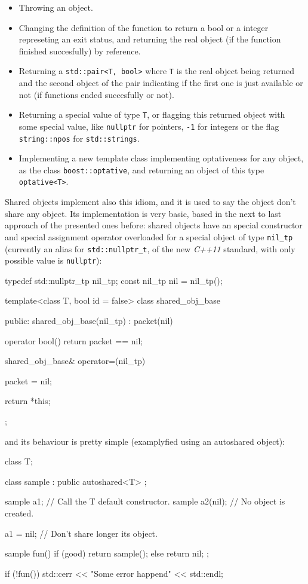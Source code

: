 \documentclass{article}
\begin{document}
\begin{itemize}
\item Throwing an object.
\item Changing the definition of the function to return a bool or a integer
  represeting an exit status, and returning the real object (if the function
  finished succesfully) by reference.
\item Returning a \texttt{std::pair<T, bool>} where \texttt{T} is the real
  object being returned and the second object of the pair indicating if the
  first one is just available or not (if functions ended succesfully or not).
\item Returning a special value of type \texttt{T}, or flagging this returned
  object with some special value, like \texttt{nullptr} for pointers,
  \texttt{-1} for integers or the flag \texttt{string::npos} for
  \texttt{std::strings}.
\item Implementing a new template class implementing optativeness for any
  object, as the class \texttt{boost::optative}, and returning an
  object of this type \texttt{optative<T>}.
\end{itemize}

Shared objects implement also this idiom, and it is used to say the object don't
share any object. Its implementation is very basic, based in the next to last
approach of the presented ones before: shared objects have an special
constructor and special assignment operator overloaded for a special object of
type \texttt{nil\_tp} (currently an alias for \texttt{std::nullptr\_t}, of the
new \textit{C++11} standard, with only possible value is \texttt{nullptr}):

\begin{Cpp}
  typedef std::nullptr_tp nil_tp;
  const nil_tp nil = nil_tp();

  template<class T, bool id = false>
  class shared_obj_base
  {
  public:
    shared_obj_base(nil_tp) : packet(nil)
    {}

    operator bool() { return packet == nil; }

    shared_obj_base& operator=(nil_tp)
    {
       packet = nil;

       return *this;
    }
  };
\end{Cpp}

\noindent and its behaviour is pretty simple (examplyfied using an autoshared object):

\begin{Cpp}
   class T;

   class sample : public autoshared<T>
   {};

   sample a1; // Call the T default constructor.
   sample a2(nil);  // No object is created.

   a1 = nil;  // Don't share longer its object.

   sample fun()
   {
      if (good)
         return sample();
      else
         return nil;
   };

   if (!fun())
      std::cerr << "Some error happend" << std::endl;
\end{Cpp}
\end{document}
